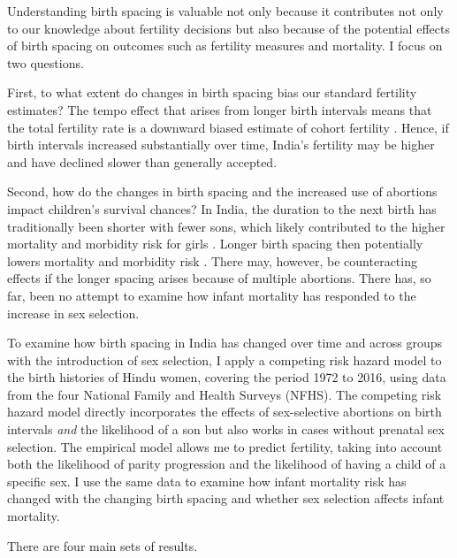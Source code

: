 \documentclass[12pt,letterpaper]{article}
\begin{document}
Understanding birth spacing is valuable not only because it contributes not only to our 
knowledge about fertility decisions but also because of the potential effects of birth 
spacing on outcomes such as fertility measures and mortality. 
I focus on two questions. 

First, to what extent do changes in birth spacing bias our standard fertility estimates?
The tempo effect that arises from longer birth intervals means that the total fertility 
rate is a downward biased estimate of cohort fertility 
\citep{Hotz1997,Bongaarts1999,Ni-Bhrolchain2011}.
Hence, if birth intervals increased substantially over time, India's fertility may 
be higher and have declined slower than generally accepted.

Second, how do the changes in birth spacing and the increased use of abortions impact 
children's survival chances?
In India, the duration to the next birth has traditionally been shorter with fewer sons, 
which likely contributed to the higher mortality and morbidity risk for girls
\citep{Whitworth2002,Bhalotra2008,Maitra2008,Jayachandran2011,Jayachandran2017a}.
Longer birth spacing then potentially lowers mortality and morbidity risk 
\citep{Conde-Agudelo2012,Molitoris2019}.
There may, however, be counteracting effects if the longer spacing arises because of 
multiple abortions.
There has, so far, been no attempt to examine how infant mortality has responded 
to the increase in sex selection.


To examine how birth spacing in India has changed over time and across groups with the 
introduction of sex selection, I apply a competing risk hazard model to the birth 
histories of Hindu women, covering the period 1972 to 2016, using data from the four 
National Family and Health Surveys (NFHS).
The competing risk hazard model directly incorporates the effects of 
sex-selective abortions on birth intervals
\emph{and} 
the likelihood of a son 
but also works in cases without prenatal sex selection.
The empirical model allows me to predict fertility, taking into
account both the likelihood of parity progression and the likelihood of having a child of 
a specific sex.
I use the same data to examine how infant mortality risk has changed with the changing 
birth spacing and whether sex selection affects infant mortality.
 

There are four main sets of results.
\end{document}
